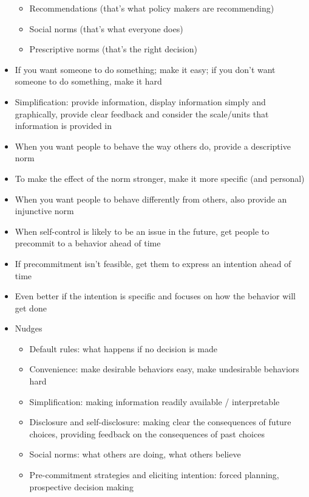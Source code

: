 \documentclass[12pt]{article}
\begin{document}
\begin{itemize}
\begin{itemize}
\item Recommendations (that's what policy makers are recommending) 
\item Social norms (that's what everyone does) 
\item Prescriptive norms (that's the right decision) \end{itemize} 
\item  If you want someone to do something; make it easy; if you don't want someone to do something, make it hard 
\item Simplification: provide information, display information simply and graphically, provide clear feedback and consider the scale/units that information is provided in 
\item When you want people to behave the way others do, provide a descriptive norm
\item To make the effect of the norm stronger, make it more specific (and personal) 
\item When you want people to behave differently from others, also provide an injunctive norm 
\item When self-control is likely to be an issue in the future, get people to precommit to a behavior ahead of time
\item If precommitment isn't feasible, get them to express an intention ahead of time
\item Even better if the intention is specific and focuses on how the behavior will get done 
\item Nudges \begin{itemize} 
\item Default rules: what happens if no decision is made 
\item Convenience: make desirable behaviors easy, make undesirable behaviors hard 
\item Simplification: making information readily available / interpretable 
\item Disclosure and self-disclosure: making clear the consequences of future choices, providing feedback on the consequences of past choices 
\item Social norms: what others are doing, what others believe 
\item Pre-commitment strategies and eliciting intention: forced planning, prospective decision making \end{itemize} 
\end{itemize}
\end{document}
